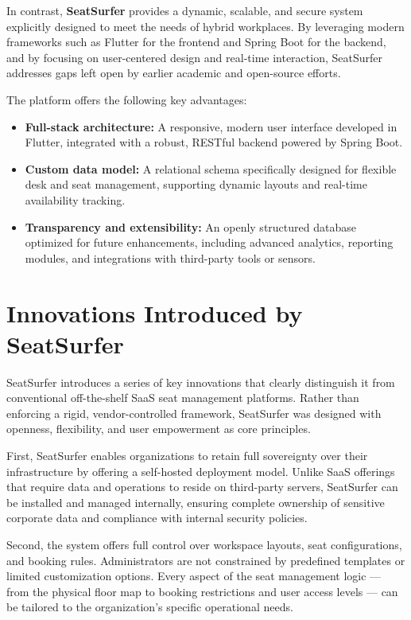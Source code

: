 \documentclass[12pt,a4paper]{report}
\begin{document}
In contrast, \textbf{SeatSurfer} provides a dynamic, scalable, and secure system explicitly designed to meet the needs of hybrid workplaces. By leveraging modern frameworks such as Flutter for the frontend and Spring Boot for the backend, and by focusing on user-centered design and real-time interaction, SeatSurfer addresses gaps left open by earlier academic and open-source efforts.

The platform offers the following key advantages:
\begin{itemize}
    \item \textbf{Full-stack architecture:} A responsive, modern user interface developed in Flutter, integrated with a robust, RESTful backend powered by Spring Boot.
    \item \textbf{Custom data model:} A relational schema specifically designed for flexible desk and seat management, supporting dynamic layouts and real-time availability tracking.
    \item \textbf{Transparency and extensibility:} An openly structured database optimized for future enhancements, including advanced analytics, reporting modules, and integrations with third-party tools or sensors.
\end{itemize}

\section{Innovations Introduced by SeatSurfer}

SeatSurfer introduces a series of key innovations that clearly distinguish it from conventional off-the-shelf SaaS seat management platforms. Rather than enforcing a rigid, vendor-controlled framework, SeatSurfer was designed with openness, flexibility, and user empowerment as core principles.

First, SeatSurfer enables organizations to retain full sovereignty over their infrastructure by offering a self-hosted deployment model. Unlike SaaS offerings that require data and operations to reside on third-party servers, SeatSurfer can be installed and managed internally, ensuring complete ownership of sensitive corporate data and compliance with internal security policies.

Second, the system offers full control over workspace layouts, seat configurations, and booking rules. Administrators are not constrained by predefined templates or limited customization options. Every aspect of the seat management logic — from the physical floor map to booking restrictions and user access levels — can be tailored to the organization's specific operational needs.
\end{document}
